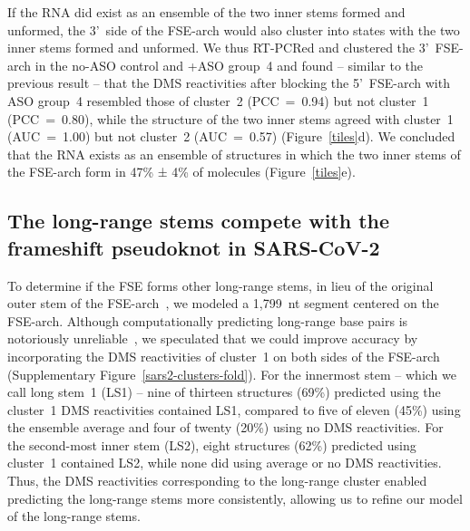 \documentclass[main.tex]{subfiles}
\begin{document}
If the RNA did exist as an ensemble of the two inner stems formed and unformed, the 3'~side of the FSE-arch would also cluster into states with the two inner stems formed and unformed.
We thus RT-PCRed and clustered the 3'~FSE-arch in the no-ASO control and +ASO group~4 and found -- similar to the previous result -- that the DMS reactivities after blocking the 5'~FSE-arch with ASO group~4 resembled those of cluster~2 (PCC~=~0.94) but not cluster~1 (PCC~=~0.80), while the structure of the two inner stems agreed with cluster~1 (AUC~=~1.00) but not cluster~2 (AUC~=~0.57) (Figure~\ref{tiles}d).
We concluded that the RNA exists as an ensemble of structures in which the two inner stems of the FSE-arch form in 47\% ± 4\% of molecules (Figure~\ref{tiles}e).

\subsection{The long-range stems compete with the frameshift pseudoknot in SARS-CoV-2}

To determine if the FSE forms other long-range stems, in lieu of the original outer stem of the FSE-arch~\cite{Ziv2020}, we modeled a 1,799~nt segment centered on the FSE-arch.
Although computationally predicting long-range base pairs is notoriously unreliable~\cite{Doshi2004,Nicholson2015}, we speculated that we could improve accuracy by incorporating the DMS reactivities of cluster~1 on both sides of the FSE-arch (Supplementary Figure~\ref{sars2-clusters-fold}).
For the innermost stem -- which we call long stem~1 (LS1) -- nine of thirteen structures (69\%) predicted using the cluster~1 DMS reactivities contained LS1, compared to five of eleven (45\%) using the ensemble average and four of twenty (20\%) using no DMS reactivities.
For the second-most inner stem (LS2), eight structures (62\%) predicted using cluster~1 contained LS2, while none did using average or no DMS reactivities.
Thus, the DMS reactivities corresponding to the long-range cluster enabled predicting the long-range stems more consistently, allowing us to refine our model of the long-range stems.
\end{document}
